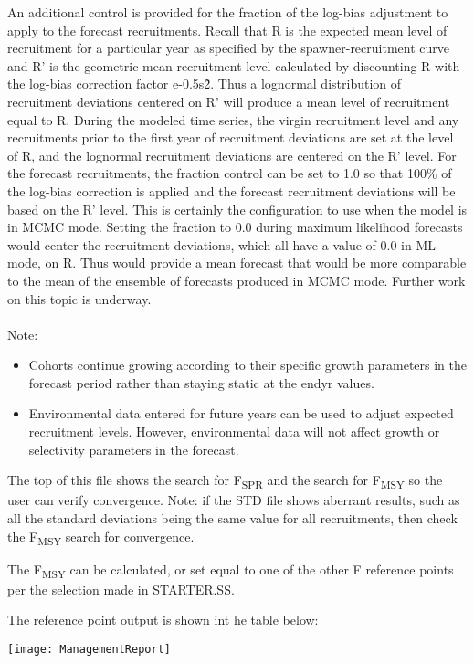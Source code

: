 An additional control is provided for the fraction of the log-bias adjustment to apply to the forecast recruitments.  Recall that R is the expected mean level of recruitment for a particular year as specified by the spawner-recruitment curve and R’ is the geometric mean recruitment level calculated by discounting R with the log-bias correction factor e-0.5s\^2.  Thus a lognormal distribution of recruitment deviations centered on R’ will produce a mean level of recruitment equal to R.  During the modeled time series, the virgin recruitment level and any recruitments prior to the first year of recruitment deviations are set at the level of R, and the lognormal recruitment deviations are centered on the R’ level.  For the forecast recruitments, the fraction control can be set to 1.0 so that 100\% of the log-bias correction is applied and the forecast recruitment deviations will be based on the R’ level.  This is certainly the configuration to use when the model is in MCMC mode.   Setting the fraction to 0.0 during maximum likelihood forecasts would center the recruitment deviations, which all have a value of 0.0 in ML mode, on R.  Thus would provide a mean forecast that would be more comparable to the mean of the ensemble of forecasts produced in MCMC mode.  Further work on this topic is underway.\\
\\
Note:
\begin{itemize}
	\item Cohorts continue growing according to their specific growth parameters in the forecast period rather than staying static at the endyr values.
	\item Environmental data entered for future years can be used to adjust expected recruitment levels.  However, environmental data will not affect growth or selectivity parameters in the forecast.
\end{itemize}

The top of this file shows the search for F\textsubscript {SPR}  and the search for F\textsubscript {MSY}  so the user can verify convergence.  Note:  if the STD file shows aberrant results, such as all the standard deviations being the same value for all recruitments, then check the F\textsubscript {MSY}  search for convergence. 

The F\textsubscript {MSY} can be calculated, or set equal to one of the other F reference points per the selection made in STARTER.SS.

The reference point output is shown int he table below: 
\begin{center}
	\texttt{[image: ManagementReport]}
\end{center}


